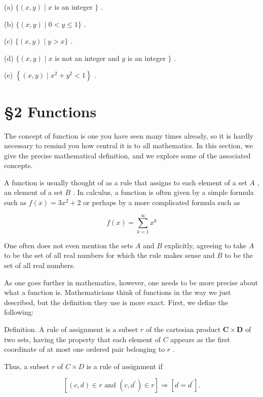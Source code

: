 (a) \(\{ \left( {x,y}\right)  \mid  x\) is an integer \(\}\) .

(b) \(\{ \left( {x,y}\right)  \mid  0 < y \leq  1\}\) .

(c) \(\{ \left( {x,y}\right)  \mid  y > x\}\) .

(d) \(\{ \left( {x,y}\right)  \mid  x\) is not an integer and \(y\) is an integer \(\}\) .

(e) \(\left\{  {\left( {x,y}\right)  \mid  {x}^{2} + {y}^{2} < 1}\right\}\) .

\section*{§2 Functions}

The concept of function is one you have seen many times already, so it is hardly necessary to remind you how central it is to all mathematics. In this section, we give the precise mathematical definition, and we explore some of the associated concepts.

A function is usually thought of as a rule that assigns to each element of a set \(A\) , an element of a set \(B\) . In calculus, a function is often given by a simple formula such as \(f\left( x\right)  = 3{x}^{2} + 2\) or perhaps by a more complicated formula such as

\[
f\left( x\right)  = \mathop{\sum }\limits_{{k = 1}}^{\infty }{x}^{k}
\]

One often does not even mention the sets \(A\) and \(B\) explicitly, agreeing to take \(A\) to be the set of all real numbers for which the rule makes sense and \(B\) to be the set of all real numbers.

As one goes further in mathematics, however, one needs to be more precise about what a function is. Mathematicians think of functions in the way we just described, but the definition they use is more exact. First, we define the following:

Definition. A rule of assignment is a subset \(r\) of the cartesian product \(\mathbf{C} \times  \mathbf{D}\) of two sets, having the property that each element of \(C\) appears as the first coordinate of at most one ordered pair belonging to \(r\) .

Thus, a subset \(r\) of \(C \times  D\) is a rule of assignment if

\[
\left\lbrack  {\left( {c,d}\right)  \in  r\text{ and }\left( {c,{d}^{\prime }}\right)  \in  r}\right\rbrack   \Rightarrow  \left\lbrack  {d = {d}^{\prime }}\right\rbrack  .
\]

